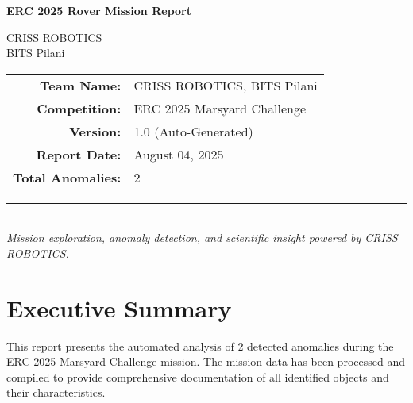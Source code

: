 \documentclass[12pt,a4paper]{report}
\newcommand\BackgroundPic{
    \put(0,0){
    \parbox[b][\paperheight]{\paperwidth}{
      \vfill
      \centering
      \transparent{0.06}
      \resizebox{0.95\textwidth}{!}{
      \scalebox{2.1}{\Huge\sf CRISS ROBOTICS -- BITS Pilani}
      }
      \vfill
    }
  }
}
\begin{document}
\AddToShipoutPicture*{\BackgroundPic}


\begin{titlepage}
    \centering
    {\Huge \bfseries ERC 2025 Rover Mission Report\par}
    \vspace{2cm}
    \vspace{1.5cm}
    {\Large CRISS ROBOTICS\\BITS Pilani}\\[0.8cm]

    \begin{tabular}{rl}
            \textbf{Team Name:} & CRISS ROBOTICS, BITS Pilani \\
            \textbf{Competition:} & ERC 2025 Marsyard Challenge \\
            \textbf{Version:} & 1.0 (Auto-Generated) \\
            \textbf{Report Date:} & August 04, 2025 \\
            \textbf{Total Anomalies:} & 2 \\
    \end{tabular}

    \vfill
    \rule{0.8\textwidth}{0.8pt} \\
    \vspace{0.5cm}
    \itshape
    Mission exploration, anomaly detection, and scientific insight powered by CRISS ROBOTICS.
\end{titlepage}

\clearpage

{
    \hypersetup{linkcolor=black}
    \tableofcontents
    \thispagestyle{empty}
    \clearpage
}


\chapter{Executive Summary}
This report presents the automated analysis of 2 detected anomalies during the ERC 2025 Marsyard Challenge mission. The mission data has been processed and compiled to provide comprehensive documentation of all identified objects and their characteristics.
\end{document}
